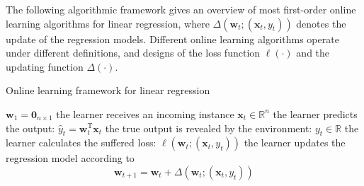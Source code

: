 The following algorithmic framework gives an overview of most first-order online learning algorithms for linear regression, where $\Delta(\mathbf{w}_t; (\mathbf{x}_t, y_t))$ denotes the update of the regression models. Different online learning algorithms operate under different definitions, and designs of the loss function $\ell(\cdot)$ and the updating function $\Delta(\cdot)$.
\begin{algorithm}[H]
  \caption{Online learning framework for linear regression}
\label{alg:online-linear-regression}
  \begin{algorithmic}[1]
     $\mathbf{w}_1 = \mathbf{0}_{n\times 1}$
      \STATE the learner receives an incoming instance $\mathbf{x}_t \in \mathbb{R}^n$
      \STATE the learner predicts the output: $\hat{y}_t = \mathbf{w}_t^\text{T} \mathbf{x}_t$
      \STATE the true output is revealed by the environment: $y_t \in \mathbb{R}$
      \STATE the learner calculates the suffered loss: $\ell(\mathbf{w}_t; (\mathbf{x}_t, y_t))$
      \STATE the learner updates the regression model according to
      \begin{equation*}
      	\mathbf{w}_{t+1} = \mathbf{w}_t + \Delta(\mathbf{w}_t; (\mathbf{x}_t, y_t))
      \end{equation*}
    \ENDIF
    \ENDFOR
  \end{algorithmic}
\end{algorithm}
